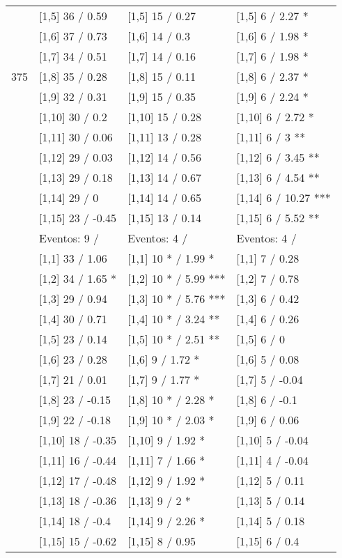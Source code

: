 \begin{table}
\begin{tabular}[t]{llll}
 & {}[1,5] 36  / 0.59 & {}[1,5] 15  / 0.27 & {}[1,5] 6  / 2.27 *\\
 & {}[1,6] 37  / 0.73 & {}[1,6] 14  / 0.3 & {}[1,6] 6  / 1.98 *\\
 & {}[1,7] 34  / 0.51 & {}[1,7] 14  / 0.16 & {}[1,7] 6  / 1.98 *\\
375 & {}[1,8] 35  / 0.28 & {}[1,8] 15  / 0.11 & {}[1,8] 6  / 2.37 *\\
\addlinespace
 & {}[1,9] 32  / 0.31 & {}[1,9] 15  / 0.35 & {}[1,9] 6  / 2.24 *\\
 & {}[1,10] 30  / 0.2 & {}[1,10] 15  / 0.28 & {}[1,10] 6  / 2.72 *\\
 & {}[1,11] 30  / 0.06 & {}[1,11] 13  / 0.28 & {}[1,11] 6  / 3 **\\
 & {}[1,12] 29  / 0.03 & {}[1,12] 14  / 0.56 & {}[1,12] 6  / 3.45 **\\
 & {}[1,13] 29  / 0.18 & {}[1,13] 14  / 0.67 & {}[1,13] 6  / 4.54 **\\
\addlinespace
 & {}[1,14] 29  / 0 & {}[1,14] 14  / 0.65 & {}[1,14] 6  / 10.27 ***\\
 & {}[1,15] 23  / -0.45 & {}[1,15] 13  / 0.14 & {}[1,15] 6  / 5.52 **\\
 & Eventos:  9 / & Eventos:  4 / & Eventos:  4 /\\
 & {}[1,1] 33  / 1.06 & {}[1,1] 10 * / 1.99 * & {}[1,1] 7  / 0.28\\
 & {}[1,2] 34  / 1.65 * & {}[1,2] 10 * / 5.99 *** & {}[1,2] 7  / 0.78\\
\addlinespace
 & {}[1,3] 29  / 0.94 & {}[1,3] 10 * / 5.76 *** & {}[1,3] 6  / 0.42\\
 & {}[1,4] 30  / 0.71 & {}[1,4] 10 * / 3.24 ** & {}[1,4] 6  / 0.26\\
 & {}[1,5] 23  / 0.14 & {}[1,5] 10 * / 2.51 ** & {}[1,5] 6  / 0\\
 & {}[1,6] 23  / 0.28 & {}[1,6] 9  / 1.72 * & {}[1,6] 5  / 0.08\\
 & {}[1,7] 21  / 0.01 & {}[1,7] 9  / 1.77 * & {}[1,7] 5  / -0.04\\
\addlinespace
500 & {}[1,8] 23  / -0.15 & {}[1,8] 10 * / 2.28 * & {}[1,8] 6  / -0.1\\
 & {}[1,9] 22  / -0.18 & {}[1,9] 10 * / 2.03 * & {}[1,9] 6  / 0.06\\
 & {}[1,10] 18  / -0.35 & {}[1,10] 9  / 1.92 * & {}[1,10] 5  / -0.04\\
 & {}[1,11] 16  / -0.44 & {}[1,11] 7  / 1.66 * & {}[1,11] 4  / -0.04\\
 & {}[1,12] 17  / -0.48 & {}[1,12] 9  / 1.92 * & {}[1,12] 5  / 0.11\\
\addlinespace
 & {}[1,13] 18  / -0.36 & {}[1,13] 9  / 2 * & {}[1,13] 5  / 0.14\\
 & {}[1,14] 18  / -0.4 & {}[1,14] 9  / 2.26 * & {}[1,14] 5  / 0.18\\
 & {}[1,15] 15  / -0.62 & {}[1,15] 8  / 0.95 & {}[1,15] 6  / 0.4\\
\bottomrule
\end{tabular}
\end{table}
